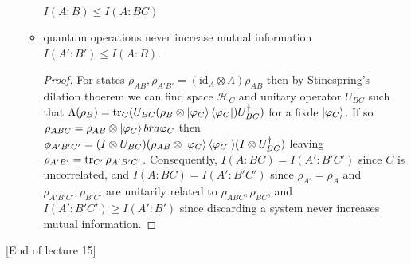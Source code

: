 \documentclass{article}
\theoremstyle{definition}
\newcommand{\id}{\text{id}}
\begin{document}
\begin{itemize}
\begin{itemize}
        $I(A : B) \leq I(A : BC)$
      \item quantum operations never increase mutual information $I(A' : B')
        \leq I(A : B)$.
        \begin{proof}
          For states $\rho_{AB}, \rho_{A'B'} = (\id_A \otimes \Lambda) 
          \rho_{AB}$ then by Stinespring's dilation thoerem we can find space
          $\mathcal{H}_C$ and unitary operator $U_{BC}$ such that $\Lambda(
          \rho_B) = \tr_C (U_{BC} (\rho_B \otimes \ket{\varphi_C} 
          \bra{\varphi_C}) U_{BC}^\dagger)$ for a fixde $\ket{\varphi_C}$. If
          so $\rho_{ABC} = \rho_{AB} \otimes \ket{\varphi_C} bra{\varphi_C}$
          then $\phi_{A'B'C'} = (I \otimes U_{BC}) (\rho_{AB} \otimes 
          \ket{\varphi_C} \bra{\varphi_C}) (I \otimes U_{BC}^\dagger)$ leaving
          $\rho_{A'B'} = \tr_{C'} \rho_{A'B'C'}$. Consequently, $I(A : BC) = 
          I(A' : B'C')$ since $C$ is uncorrelated, and $I(A : BC) = I(A':B'C')$
          since $\rho_{A'} = \rho_A$ and $\rho_{A'B'C'}, \rho_{B'C'}$ are 
          unitarily related to $\rho_{ABC}, \rho_{BC}$, and $I(A' : B'C') \geq
          I(A':B')$ since discarding a system never increases mutual
          information.
        \end{proof}
    \end{itemize}
\end{itemize}
[End of lecture 15]
\end{document}
